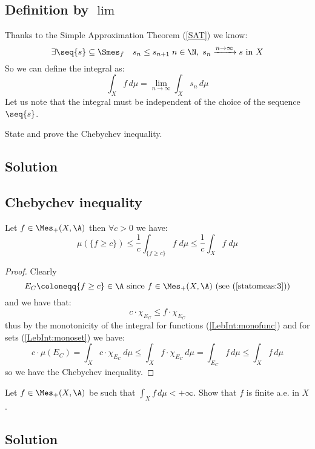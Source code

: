 \subsection{Definition by \texorpdfstring{$\lim$}{the limit}}
Thanks to the Simple Approximation Theorem (\ref{SAT}) we know:
\[
    \exists \seq{s} \subseteq \Smes_f \quad s_n\leq s_{n+1} \; n\in\N, \; s_n\xrightarrow{n\to\infty} s \text{ in } X
\]
So we can define the integral as:
\[
    \int_X f \,d\mu = \lim_{n\to\infty} \int_X s_n \,d\mu    
\]
Let us note that the integral must be independent of the choice of the sequence $\seq{s}$.


\question

State and prove the Chebychev inequality.

\subsection*{Solution}

\subsection{Chebychev inequality}\label{ChebIneq}

Let $f\in\Mes_+(X,\A)$ then $\forall c>0$ we have:
\[
    \mu( \{  f\geq c \}) \leq \frac{1}{c} \int_{ \{ f \geq c \}} f\; d\mu \leq \frac{1}{c} \int_X f\; d\mu    
\]
\begin{proof}
    Clearly
    \[
        E_C \coloneqq \{ f\geq c \} \in \A \text{ since } f\in\Mes_+(X,\A) \text{ (see (\ref{statomeas:3}))} 
    \]
    and we have that:
    \[
        c\cdot \chi_{E_C} \leq f \cdot \chi_{E_C}    
    \]
    thus by the monotonicity of the integral for functions (\ref{LebInt:monofunc}) and for sets (\ref{LebInt:monoset}) we have:
    \[
        c\cdot \mu(E_C) = \int_ X c\cdot \chi_{E_C} \, d\mu \leq \int_ X f \cdot \chi_{E_C} \, d\mu = \int_{E_C} f \, d\mu \leq \int_X f \, d\mu
    \]
    so we have the Chebychev inequality.
\end{proof}


\question

Let $f \in \Mes_+(X, \A)$ be such that $\int_X f \, d\mu < +\infty$. Show that $f$ is finite a.e. in $X$.

\subsection*{Solution}

